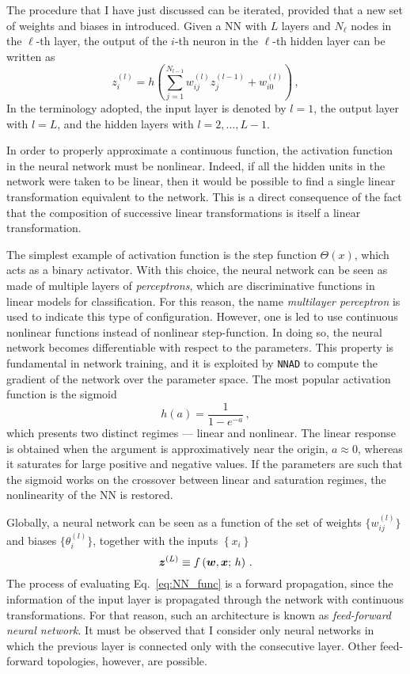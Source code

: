 The procedure that I have just discussed can be iterated, provided that a new set of weights and biases in introduced. Given a NN with $L$ layers and $N_{\ell}$ nodes in the $\ell$-th layer, the output of the $i$-th neuron in the $\ell$-th hidden layer can be written as
\begin{equation}
  z_{i}^{(l)} = h \left( \sum_{j=1}^{N_{l-1}} w_{ij}^{(l)} z_{j}^{(l-1)} + w_{i0}^{(l)} \right) \,,
  \label{eq:activity}
\end{equation}
In the terminology adopted, the input layer is denoted by $l=1$, the output layer with $l=L$, and the hidden layers with $l=2,\dots,L-1$.%

In order to properly approximate a continuous function, the activation function in the neural network must be nonlinear. Indeed, if all the hidden units in the network were taken to be linear, then it would be possible to find a single linear transformation equivalent to the network. This is a direct consequence of the fact that the composition of successive linear transformations is itself a linear transformation.%

The simplest example of activation function is the step function $\Theta(x)$, which acts as a binary activator. With this choice, the neural network can be seen as made of multiple layers of \textit{perceptrons}, which are discriminative functions in linear models for classification. For this reason, the name \textit{multilayer perceptron} is used to indicate this type of configuration. However, one is led to use continuous nonlinear functions instead of nonlinear step-function. In doing so, the neural network becomes differentiable with respect to the parameters. This property is fundamental in network training, and it is exploited by \texttt{NNAD} to compute the gradient of the network over the parameter space. The most popular activation function is the sigmoid
\begin{equation}
  h(a) = \frac{1}{1 - e^{-a}}\,,
  \label{eq:sigmoid}
\end{equation}
which presents two distinct regimes — linear and nonlinear. The linear response is obtained when the argument is approximatively near the origin, $a \approx 0$, whereas it saturates for large positive and negative values. If the parameters are such that the sigmoid works on the crossover between linear and saturation regimes, the nonlinearity of the NN is restored.\par
Globally, a neural network can be seen as a function of the set of weights $\{ w^{(l)}_{ij} \}$ and biases $\{ \theta_{i}^{(l)} \}$, together with the inputs $\left\{  x_i\right\}$
\begin{equation}
  \vb*{z}^{(L)} \equiv f \left( \vb*{w}, \vb*{x}; \, h \right) \,.
  \label{eq:NN_func}
\end{equation}
The process of evaluating Eq.~\eqref{eq:NN_func} is a forward propagation, since the information of the input layer is propagated through the network with continuous transformations. For that reason, such an architecture is known as \textit{feed-forward neural network}. It must be observed that I consider only neural networks in which the previous layer is connected only with the consecutive layer. Other feed-forward topologies, however, are possible.%

